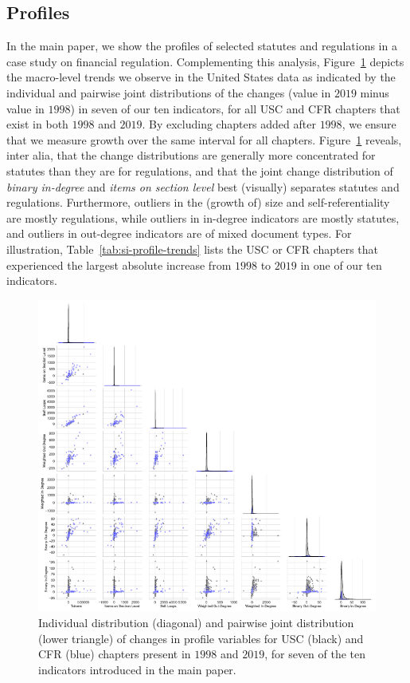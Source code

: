\documentclass[utf8,sort&compress,numbers,square,table,hidelinks]{frontiers_suppmat} %
\begin{document}
\subsection{Profiles}
In the main paper, we show the profiles of selected statutes and regulations in a case study on financial regulation. 
Complementing this analysis, Figure~\ref{fig:si-profile-trends} depicts the macro-level trends we observe in the United States data as indicated by the individual and pairwise joint distributions of the changes (value in $2019$ minus value in $1998$) in seven of our ten indicators, for all USC and CFR chapters that exist in both $1998$ and $2019$.
By excluding chapters added after $1998$, we ensure that we measure growth over the same interval for all chapters.
Figure~\ref{fig:si-profile-trends} reveals, inter alia, that the change distributions are generally more concentrated for statutes than they are for regulations, and that the joint change distribution of \emph{binary in-degree} and \emph{items on section level} best (visually) separates statutes and regulations.
Furthermore, outliers in the (growth of) size and self-referentiality are mostly regulations, while outliers in in-degree indicators are mostly statutes, and outliers in out-degree indicators are of mixed document types.
For illustration, Table~\ref{tab:si-profile-trends} lists the USC or CFR chapters that experienced the largest absolute increase from $1998$ to $2019$ in one of our ten indicators.


\begin{figure}
	\centering
	\includegraphics[width=\textwidth]{figure_si_profile_trends.pdf}
	\caption{%
	Individual distribution (diagonal) and pairwise joint distribution (lower triangle) of changes in profile variables for USC (black) and CFR (blue) chapters present in $1998$ and $2019$, for seven of the ten indicators introduced in the main paper.
	}\label{fig:si-profile-trends}
\end{figure}
\end{document}
